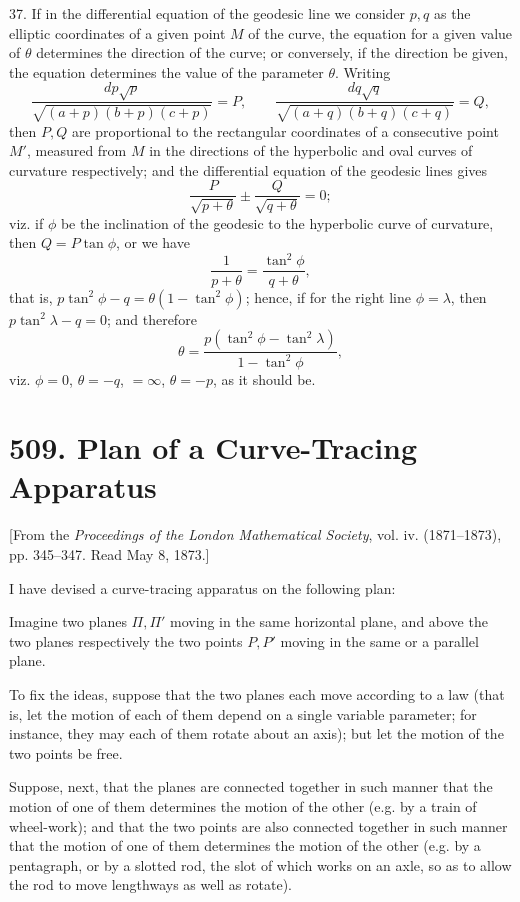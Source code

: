 \documentclass[11pt,a4paper]{article}
\newcommand{\paperid}[1]{\par\medskip\noindent{\bfseries [#1]}\quad}
\begin{document}
37. If in the differential equation of the geodesic line we consider $p,q$ as the elliptic
coordinates of a given point $M$ of the curve, the equation for a given value of $\theta$
determines the direction of the curve; or conversely, if the direction be given, the equation
determines the value of the parameter $\theta$. Writing
\[
 \frac{dp\sqrt p}{\sqrt{(a+p)(b+p)(c+p)}}=P,\qquad
 \frac{dq\sqrt q}{\sqrt{(a+q)(b+q)(c+q)}}=Q,
\]
then $P,Q$ are proportional to the rectangular coordinates of a consecutive point $M'$,
measured from $M$ in the directions of the hyperbolic and oval curves of curvature
respectively; and the differential equation of the geodesic lines gives
\[
 \frac{P}{\sqrt{p+\theta}}\pm\frac{Q}{\sqrt{q+\theta}}=0;
\]
viz. if $\phi$ be the inclination of the geodesic to the hyperbolic curve of curvature,
then $Q=P\tan\phi$, or we have
\[
 \frac{1}{p+\theta}=\frac{\tan^2\phi}{q+\theta},
\]
that is, $p\tan^2\phi-q=\theta(1-\tan^2\phi)$; hence, if for the right line $\phi=\lambda$,
then $p\tan^2\lambda-q=0$; and therefore
\[
 \theta=\frac{p(\tan^2\phi-\tan^2\lambda)}{1-\tan^2\phi},
\]
viz. $\phi=0$, $\theta=-q$, $=\infty$, $\theta=-p$, as it should be.

\paperid{509}
\section*{509. Plan of a Curve-Tracing Apparatus}

\begin{center}
{\small [From the \emph{Proceedings of the London Mathematical Society}, vol. iv. (1871--1873),
pp. 345--347. Read May 8, 1873.]}
\end{center}

I have devised a curve-tracing apparatus on the following plan:

Imagine two planes $\Pi,\Pi'$ moving in the same horizontal plane, and above the two planes
respectively the two points $P,P'$ moving in the same or a parallel plane.

To fix the ideas, suppose that the two planes each move according to a law (that is, let the
motion of each of them depend on a single variable parameter; for instance, they may each of
them rotate about an axis); but let the motion of the two points be free.

Suppose, next, that the planes are connected together in such manner that the motion of one
of them determines the motion of the other (e.g. by a train of wheel-work); and that the two
points are also connected together in such manner that the motion of one of them determines
the motion of the other (e.g. by a pentagraph, or by a slotted rod, the slot of which works
on an axle, so as to allow the rod to move lengthways as well as rotate).
\end{document}
